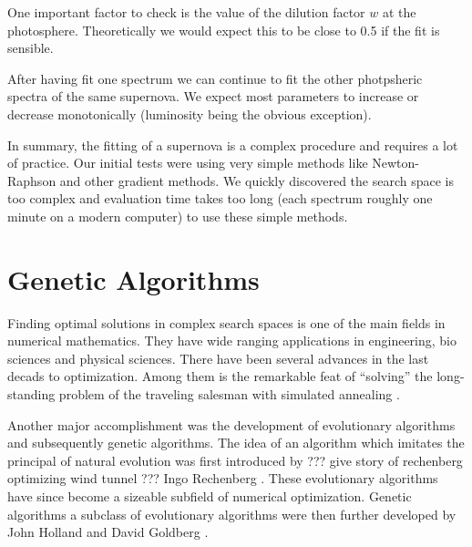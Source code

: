 One important factor to check is the value of the dilution factor $w$ at the photosphere. Theoretically we would expect this to be close to 0.5 if the fit is sensible. 

After having fit one spectrum we can continue to fit the other photpsheric spectra of the same supernova. We expect most parameters to increase or decrease monotonically (luminosity being the obvious exception). 

In summary, the fitting of a supernova is a complex procedure and requires a lot of practice. Our initial tests were using very simple methods like Newton-Raphson and other gradient methods. We quickly discovered the search space is too complex and evaluation time takes too long (each spectrum roughly one minute on a modern computer) to use these simple methods. 

 
\section{Genetic Algorithms}

Finding optimal solutions in complex search spaces is one of the main fields in numerical mathematics.  They have wide ranging applications in engineering, bio sciences and physical sciences. There have been several advances in the last decads to optimization. 
Among them is the  remarkable feat of ``solving'' the long-standing problem of the traveling salesman with simulated annealing \citep{Kirkpatrick13051983}.

\cite{Holland:1962:OLT:321127.321128}
Another major accomplishment was the development of evolutionary algorithms and subsequently genetic algorithms. The idea of an algorithm which imitates the principal of natural evolution was first introduced by ??? give story of rechenberg optimizing wind tunnel ??? Ingo Rechenberg \citep{Rechenberg1973}. These evolutionary algorithms have since become a sizeable subfield of numerical optimization. Genetic algorithms a subclass of evolutionary algorithms were then further developed by John Holland and David Goldberg \citep{citeulike:125978}.

